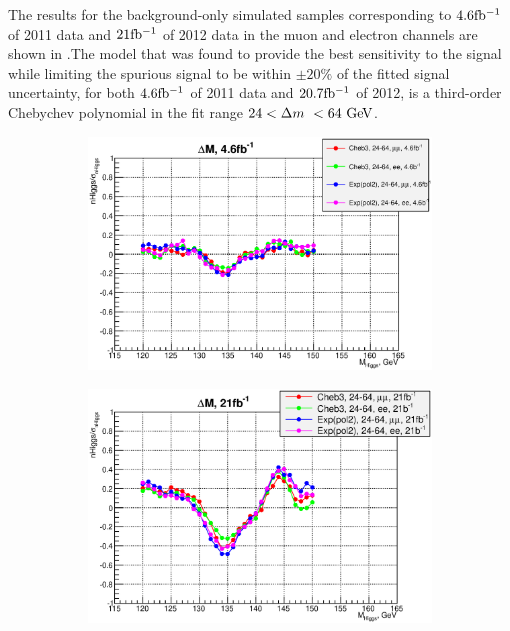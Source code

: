 The results for the background-only simulated samples corresponding to $4.6 \mbox{fb$^{-1}$}$
of 2011 data and $21 \mbox{fb$^{-1}$}$ of 2012 data in the muon and electron channels are
shown in .The model that was found to provide the best 
sensitivity to the signal while limiting
the spurious signal to be within $\pm20\%$ of the fitted signal uncertainty, for
both $4.6 \mbox{fb$^{-1}$}$ of 2011 data and $20.7 \mbox{fb$^{-1}$}$ of 2012, is a third-order 
Chebychev polynomial in the fit range $24 < \dm < 64 \GeV$.

\begin{figure}[htbp]
    \centering
    \begin{subfigure}[b]{0.45\textwidth}
      \centering
      \includegraphics[width=\textwidth]{figures/rat4orig.eps}
      \caption{}
      \label{fig:4spurious}
    \end{subfigure}
    \quad
    \begin{subfigure}[b]{0.45\textwidth}
      \centering
      \includegraphics[width=\textwidth]{figures/rat21orig.eps}

\end{subfigure}
\end{figure}
